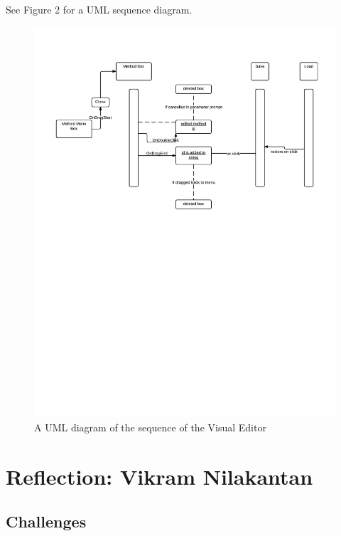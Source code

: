 \documentclass[a4paper]{article}
\begin{document}
See Figure 2 for a UML sequence diagram.
\begin{figure}[h!]
  \caption{A UML diagram of the sequence of the Visual Editor}
  \centering
	\includegraphics[width=\linewidth]{sequence}
\end{figure}

\section{Reflection: Vikram Nilakantan}
\subsection{Challenges}
\end{document}
